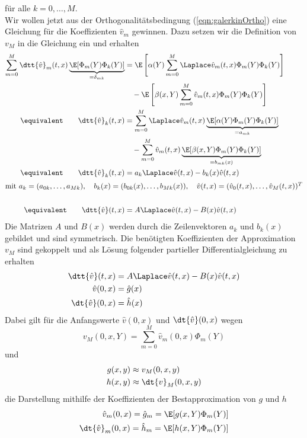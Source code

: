 für alle $k=0,\dots,M$.\\
Wir wollen jetzt aus der Orthogonalitätsbedingung (\ref{eqn:galerkinOrtho}) eine Gleichung für die Koeffizienten $\hat{v}_m$ gewinnen. Dazu setzen wir die Definition von $v_M$ in die Gleichung ein und erhalten
\begin{align*}
\sum_{m=0}^M\dtt{\hat{v}}_m(t,x)\underbrace{\E[\Phi_m(Y)\Phi_k(Y)]}_{=\delta_{mk}}&=\E\left[\alpha(Y)\sum_{m=0}^M\Laplace \hat{v}_m(t,x)\Phi_m(Y)\Phi_k(Y)\right]\\
&\quad -\E\left[\beta(x,Y)\sum_{m=0}^M\hat{v}_m(t,x)\Phi_m(Y)\Phi_k(Y)\right]\\
\equivalent \qquad \dtt{\hat{v}}_k(t,x)&=\sum_{m=0}^M\Laplace \hat{v}_m(t,x)\underbrace{\E[\alpha(Y)\Phi_m(Y)\Phi_k(Y)]}_{=a_{mk}}\\
&\quad -\sum_{m=0}^M\hat{v}_m(t,x)\underbrace{\E[\beta(x,Y)\Phi_m(Y)\Phi_k(Y)]}_{=b_{mk}(x)}\\
\equivalent \qquad \dtt{\hat{v}}_k(t,x)&=a_k\Laplace \hat{v}(t,x)-b_k(x)\hat{v}(t,x)\\
\intertext{mit $ a_k=(a_{0k},\dots,a_{Mk}),\quad b_k(x)=(b_{0k}(x),\dots,b_{Mk}(x)),\quad \hat{v}(t,x)=(\hat{v}_0(t,x),\dots,\hat{v}_M(t,x))^T$}\\
\equivalent \qquad \dtt{\hat{v}}(t,x)&=A\Laplace \hat{v}(t,x)-B(x)\hat{v}(t,x)
\end{align*}
Die Matrizen $A$ und $B(x)$ werden durch die Zeilenvektoren $a_k$ und $b_k(x)$ gebildet und sind symmetrisch. Die benötigten Koeffizienten der Approximation $v_M$ sind gekoppelt und als Lösung folgender partieller Differentialgleichung zu erhalten
\begin{equation}
\label{eqn:galerkin_dgl}
\begin{split}
\dtt{\hat{v}}(t,x)&=A\Laplace \hat{v}(t,x)-B(x)\hat{v}(t,x)\\
\hat{v}(0,x)&=\hat{g}(x)\\
\dt{\hat{v}}(0,x)&=\hat{h}(x)\\
\end{split}
\end{equation}
Dabei gilt für die Anfangswerte $\hat{v}(0,x)$ und $\dt{\hat{v}}(0,x)$ wegen 
\[v_M(0,x,Y)=\sum_{m=0}^M\hat{v}_m(0,x)\Phi_m(Y)\]
und
\begin{align*}
g(x,y)&\approx v_M(0,x,y)\\
h(x,y)&\approx \dt{v}_M(0,x,y)
\end{align*}
die Darstellung mithilfe der Koeffizienten der Bestapproximation von $g$ und $h$
\begin{align*}
\hat{v}_m(0,x)=\hat{g}_m=\E[g(x,Y)\Phi_m(Y)]\\
\dt{\hat{v}}_m(0,x)=\hat{h}_m=\E[h(x,Y)\Phi_m(Y)]
\end{align*}
